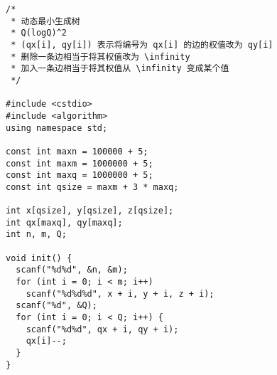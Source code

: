 \begin{lstlisting}
/*
 * 动态最小生成树
 * Q(logQ)^2
 * (qx[i], qy[i]) 表示将编号为 qx[i] 的边的权值改为 qy[i]
 * 删除一条边相当于将其权值改为 \infinity
 * 加入一条边相当于将其权值从 \infinity 变成某个值
 */

#include <cstdio>
#include <algorithm>
using namespace std;

const int maxn = 100000 + 5;
const int maxm = 1000000 + 5;
const int maxq = 1000000 + 5;
const int qsize = maxm + 3 * maxq;

int x[qsize], y[qsize], z[qsize];
int qx[maxq], qy[maxq];
int n, m, Q;

void init() {
  scanf("%d%d", &n, &m);
  for (int i = 0; i < m; i++)
    scanf("%d%d%d", x + i, y + i, z + i);
  scanf("%d", &Q);
  for (int i = 0; i < Q; i++) {
    scanf("%d%d", qx + i, qy + i);
    qx[i]--;
  }
}


\end{lstlisting}
